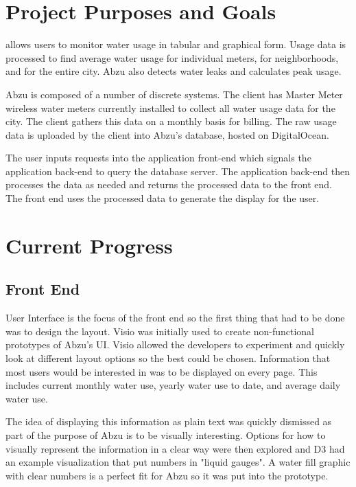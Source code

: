 \documentclass[journal]{IEEEtran}
\begin{document}
\section{Project Purposes and Goals}
 allows users to monitor water usage in tabular and graphical form. Usage data is processed to find average water usage for individual meters, for neighborhoods, and for the entire city. Abzu also detects water leaks and calculates peak usage. 

Abzu is composed of a number of discrete systems. The client has Master Meter wireless water meters currently installed to collect all water usage data for the city. The client gathers this data on a monthly basis for billing. The raw usage data is uploaded by the client into Abzu's database, hosted on DigitalOcean.

The user inputs requests into the application front-end which signals the application back-end to query the database server. The application back-end then processes the data as needed and returns the processed data to the front end. The front end uses the processed data to generate the display for the user. 



\section{Current Progress}
\subsection{Front End}
 User Interface is the focus of the front end so the first thing that had to be done was to design the layout. Visio was initially used to create non-functional prototypes of Abzu's UI. Visio allowed the developers to experiment and quickly look at different layout options so the best could be chosen. Information that most users would be interested in was to be displayed on every page. This includes current monthly water use, yearly water use to date, and average daily water use.

The idea of displaying this information as plain text was quickly dismissed as part of the purpose of Abzu is to be visually interesting. Options for how to visually represent the information in a clear way were then explored and D3 had an example visualization that put numbers in "liquid gauges". A water fill graphic with clear numbers is a perfect fit for Abzu so it was put into the prototype.
\end{document}
